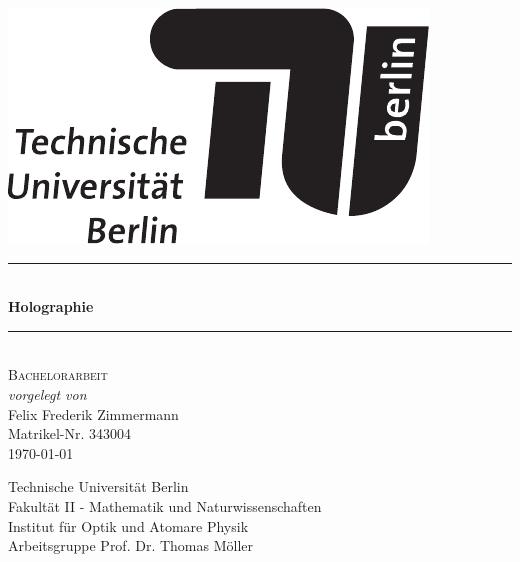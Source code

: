 \begin{titlepage}

\begin{center}


\begin{flushright}
\includegraphics[width=.3\textwidth]{./images/TU_Logo.pdf}\\[2.5cm]    
\end{flushright}




\newcommand{\HRule}{\rule{\linewidth}{0.5mm}}
\HRule \\[0.4cm]
{ \huge \bfseries Holographie}\\[0.4cm]

\HRule \\[1.5cm]

\textsc{\Large Bachelorarbeit}\\[0.5cm]

\emph{vorgelegt von}\\
Felix Frederik Zimmermann\\
Matrikel-Nr. 343004\\[0.5cm]
{\large \today}


\vfill

Technische Universität Berlin\\
Fakultät II - Mathematik und Naturwissenschaften\\
Institut für Optik und Atomare Physik\\
Arbeitsgruppe Prof. Dr. Thomas Möller\\

\end{center}

\end{titlepage}